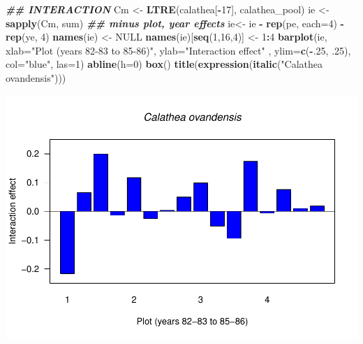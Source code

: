 \documentclass[
]{book}
\newenvironment{Shaded}{\begin{snugshade}}{\end{snugshade}}
\newcommand{\AttributeTok}[1]{\textcolor[rgb]{0.13,0.29,0.53}{#1}}
\newcommand{\ConstantTok}[1]{\textcolor[rgb]{0.56,0.35,0.01}{#1}}
\newcommand{\DecValTok}[1]{\textcolor[rgb]{0.00,0.00,0.81}{#1}}
\newcommand{\DocumentationTok}[1]{\textcolor[rgb]{0.56,0.35,0.01}{\textbf{\textit{#1}}}}
\newcommand{\FunctionTok}[1]{\textcolor[rgb]{0.13,0.29,0.53}{\textbf{#1}}}
\newcommand{\NormalTok}[1]{#1}
\newcommand{\OtherTok}[1]{\textcolor[rgb]{0.56,0.35,0.01}{#1}}
\newcommand{\SpecialCharTok}[1]{\textcolor[rgb]{0.81,0.36,0.00}{\textbf{#1}}}
\newcommand{\StringTok}[1]{\textcolor[rgb]{0.31,0.60,0.02}{#1}}
\theoremstyle{definition}
\theoremstyle{definition}
\theoremstyle{definition}
\theoremstyle{definition}
\theoremstyle{remark}
\begin{document}
\begin{Shaded}
\begin{Highlighting}[]
\DocumentationTok{\#\# INTERACTION}
\NormalTok{Cm }\OtherTok{\textless{}{-}} \FunctionTok{LTRE}\NormalTok{(calathea[}\SpecialCharTok{{-}}\DecValTok{17}\NormalTok{], calathea\_pool)}
\NormalTok{ie }\OtherTok{\textless{}{-}} \FunctionTok{sapply}\NormalTok{(Cm, sum)}
\DocumentationTok{\#\# minus plot, year effects}
\NormalTok{ie}\OtherTok{\textless{}{-}}\NormalTok{ ie }\SpecialCharTok{{-}} \FunctionTok{rep}\NormalTok{(pe, }\AttributeTok{each=}\DecValTok{4}\NormalTok{) }\SpecialCharTok{{-}} \FunctionTok{rep}\NormalTok{(ye, }\DecValTok{4}\NormalTok{)}
\FunctionTok{names}\NormalTok{(ie) }\OtherTok{\textless{}{-}} \ConstantTok{NULL}
\FunctionTok{names}\NormalTok{(ie)[}\FunctionTok{seq}\NormalTok{(}\DecValTok{1}\NormalTok{,}\DecValTok{16}\NormalTok{,}\DecValTok{4}\NormalTok{)] }\OtherTok{\textless{}{-}} \DecValTok{1}\SpecialCharTok{:}\DecValTok{4}
\FunctionTok{barplot}\NormalTok{(ie, }\AttributeTok{xlab=}\StringTok{"Plot (years 82{-}83 to 85{-}86)"}\NormalTok{, }\AttributeTok{ylab=}\StringTok{"Interaction effect"}\NormalTok{ ,}
  \AttributeTok{ylim=}\FunctionTok{c}\NormalTok{(}\SpecialCharTok{{-}}\NormalTok{.}\DecValTok{25}\NormalTok{, .}\DecValTok{25}\NormalTok{), }\AttributeTok{col=}\StringTok{"blue"}\NormalTok{, }\AttributeTok{las=}\DecValTok{1}\NormalTok{)}
\FunctionTok{abline}\NormalTok{(}\AttributeTok{h=}\DecValTok{0}\NormalTok{)}
\FunctionTok{box}\NormalTok{()}
\FunctionTok{title}\NormalTok{(}\FunctionTok{expression}\NormalTok{(}\FunctionTok{italic}\NormalTok{(}\StringTok{"Calathea ovandensis"}\NormalTok{)))}
\end{Highlighting}
\end{Shaded}

\includegraphics{Diagnostico_Poblacional_files/figure-latex/unnamed-chunk-24-3.pdf}
\end{document}
